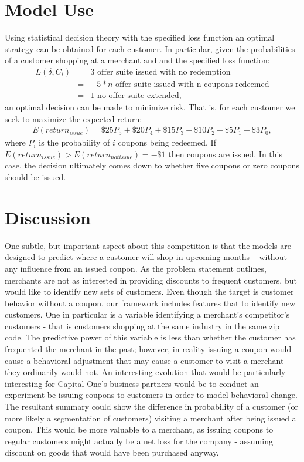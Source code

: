 \documentclass[12pt]{article} %
\begin{document}
\section{Model Use}
Using statistical decision theory with the specified loss function an optimal strategy can be obtained for each customer.
In particular, given the probabilities of a customer shopping at a merchant and and the specified loss function:  
\begin{eqnarray*}
L(\delta,C_i) &=& 3 \text {  offer suite issued with no redemption}\\
&=& -5 * n \text{  offer suite issued with n coupons redeemed}\\
&=& 1 \text{  no offer suite extended},
\end{eqnarray*}
an optimal decision can be made to minimize risk.  That is, for each customer we seek to maximize the expected return:
\begin{eqnarray}
E(return_{issue}) = \$25 P_5 + \$20 P_4 + \$15 P_3 +\$10 P_2 +\$5 P_1 - \$3 P_0,
\end{eqnarray}
where $P_i$ is the probability of $i$ coupons being redeemed.  If $E(return_{issue}) > E(return_{notissue}) =-\$1$ then coupons are issued.  In this case, the decision ultimately comes down to whether five coupons or zero coupons should be issued.
\section{Discussion}
One subtle, but important aspect about this competition is that the models are designed to predict where a customer will shop in upcoming months -- without any influence from an issued coupon.  As the problem statement outlines, merchants are not as interested in providing discounts to frequent customers, but would like to identify new sets of customers.  Even though the target is customer behavior without a coupon, our framework includes features that to identify new customers.  One in particular is a variable identifying a merchant's competitor's customers - that is customers shopping at the same industry in the same zip code.  The predictive power of this variable is less than whether the customer has frequented the merchant in the past; however, in reality issuing a coupon would cause a behavioral adjustment that may cause a customer to visit a merchant they ordinarily would not.  An interesting evolution that would be particularly interesting for Capital One's business partners would be to conduct an experiment be issuing coupons to customers in order to model behavioral change.  The resultant summary could show the difference in probability of a customer (or more likely a segmentation of customers)  visiting a merchant after being issued a coupon.  This would be more valuable to a merchant, as issuing coupons to regular customers might actually be a net loss for the company - assuming discount on goods that would have been purchased anyway.  
\end{document}
